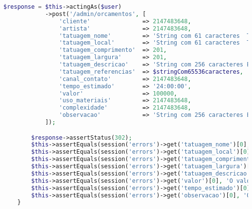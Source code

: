 \begin{lstlisting}[language=PHP, caption= Scripts de teste de Criação de Orçamentos, nolol,
label={code:CriacaoDeOrcamentoTest}]
        $response = $this->actingAs($user)
            ->post('/admin/orcamentos', [
                'cliente'               => 2147483648,
                'artista'               => 2147483648,
                'tatuagem_nome'         => 'String com 61 caracteres  TETESTETESTETESTETESTETESTETESTETES',
                'tatuagem_local'        => 'String com 61 caracteres  TETESTETESTETESTETESTETESTETESTETES',
                'tatuagem_comprimento'  => 201,
                'tatuagem_largura'      => 201,
                'tatuagem_descricao'    => 'String com 256 caracteres ESTETESTETESTETESTETESTETESTETESTETESTETESTETESTETESTETESTETESTETESTETESTETESTETESTETESTETESTETESTETESTETESTETESTETESTETESTETESTETESTETESTETESTETESTETESTETESTETESTETESTETESTETESTETESTETESTETESTETESTETESTETESTETESTETESTETESTETESTET',
                'tatuagem_referencias'  => $stringCom65536caracteres,
                'canal_contato'         => 2147483648,
                'tempo_estimado'        => '24:00:00',
                'valor'                 => 100000,
                'uso_materiais'         => 2147483648,
                'complexidade'          => 2147483648,
                'observacao'            => 'String com 256 caracteres ESTETESTETESTETESTETESTETESTETESTETESTETESTETESTETESTETESTETESTETESTETESTETESTETESTETESTETESTETESTETESTETESTETESTETESTETESTETESTETESTETESTETESTETESTETESTETESTETESTETESTETESTETESTETESTETESTETESTETESTETESTETESTETESTETESTETESTETESTET'
            ]);

        $response->assertStatus(302);
        $this->assertEquals(session('errors')->get('tatuagem_nome')[0], 'O campo tatuagem nome não pode ser superior a 60 caracteres.');
        $this->assertEquals(session('errors')->get('tatuagem_local')[0], 'O campo tatuagem local não pode ser superior a 60 caracteres.');
        $this->assertEquals(session('errors')->get('tatuagem_comprimento')[0], 'O campo tatuagem comprimento não pode ser superior a 200.');
        $this->assertEquals(session('errors')->get('tatuagem_largura')[0], 'O campo tatuagem largura não pode ser superior a 200.');
        $this->assertEquals(session('errors')->get('tatuagem_descricao')[0], 'O campo tatuagem descricao não pode ser superior a 255 caracteres.');
        $this->assertEquals(session('errors')->get('valor')[0], 'O valor do orçamento deve estar entre R$ 0,00 e R$ 99.999,99');
        $this->assertEquals(session('errors')->get('tempo_estimado')[0], 'O tempo estimado deve estar entre 00:00 e 23:59');
        $this->assertEquals(session('errors')->get('observacao')[0], 'O campo observacao não pode ser superior a 255 caracteres.');
    }


\end{lstlisting}
